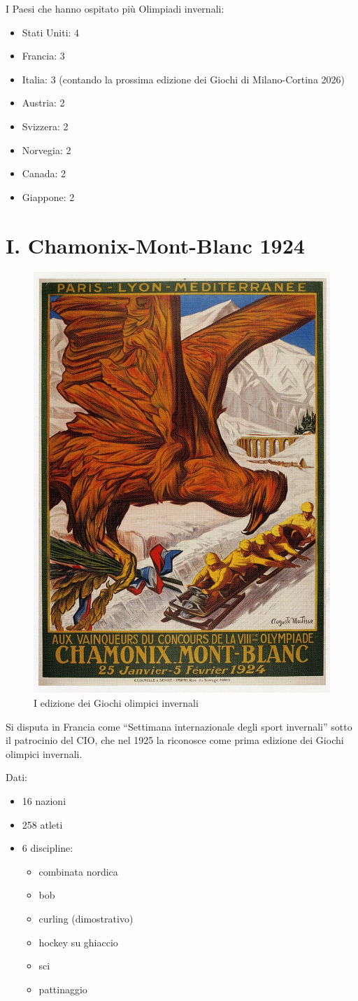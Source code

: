 \documentclass[
]{book}
\providecommand{\tightlist}{%
  \setlength{\itemsep}{0pt}\setlength{\parskip}{0pt}}
\begin{document}
I Paesi che hanno ospitato più Olimpiadi invernali:

\begin{itemize}
\tightlist
\item
  Stati Uniti: 4
\item
  Francia: 3
\item
  Italia: 3 (contando la prossima edizione dei Giochi di Milano-Cortina 2026)
\item
  Austria: 2
\item
  Svizzera: 2
\item
  Norvegia: 2
\item
  Canada: 2
\item
  Giappone: 2
\end{itemize}

\chapter*{I. Chamonix-Mont-Blanc 1924}\label{i.-chamonix-mont-blanc-1924}

\begin{figure}
\includegraphics[width=0.4\linewidth]{images/loghi/1924} \caption{I edizione dei Giochi olimpici invernali}\label{fig:unnamed-chunk-5}
\end{figure}

Si disputa in Francia come ``Settimana internazionale degli sport invernali'' sotto il patrocinio del CIO, che nel 1925 la riconosce come prima edizione dei Giochi olimpici invernali.

Dati:

\begin{itemize}
\tightlist
\item
  16 nazioni
\item
  258 atleti
\item
  6 discipline:

  \begin{itemize}
  \tightlist
  \item
    combinata nordica
  \item
    bob
  \item
    curling (dimostrativo)
  \item
    hockey su ghiaccio
  \item
    sci
  \item
    pattinaggio
  \end{itemize}
\end{itemize}
\end{document}
